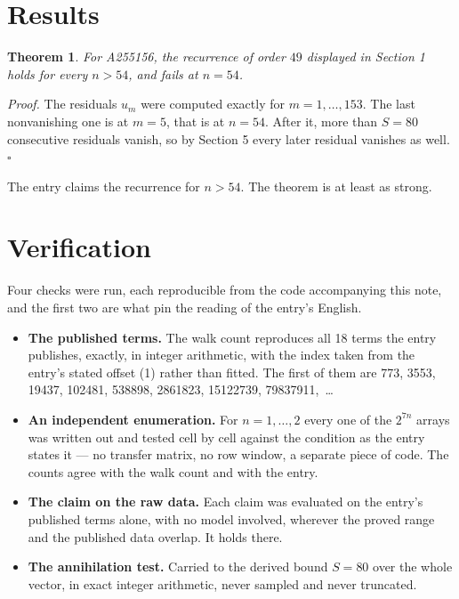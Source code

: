 \documentclass[11pt]{article}
\newtheorem{theorem}{Theorem}
\theoremstyle{definition}
\begin{document}
\section{Results}

\begin{theorem} For A255156, the recurrence of order $49$ displayed in Section 1 holds for every $n > 54$, and fails at $n = 54$.\end{theorem}

{\itshape Proof.} The residuals $u_m$ were computed exactly for $m = 1,\dots,153$. The last nonvanishing one is at $m = 5$, that is at $n = 54$. After it, more than $S = 80$ consecutive residuals vanish, so by Section 5 every later residual vanishes as well. $\square$

The entry claims the recurrence for $n > 54$. The theorem is at least as strong.

\section{Verification}

Four checks were run, each reproducible from the code accompanying this note, and the first two are what pin the reading of the entry's English.

\begin{itemize}

\item {\bfseries The published terms.} The walk count reproduces all 18 terms the entry publishes, exactly, in integer arithmetic, with the index taken from the entry's stated offset (1) rather than fitted. The first of them are 773, 3553, 19437, 102481, 538898, 2861823, 15122739, 79837911,~\dots

\item {\bfseries An independent enumeration.} For $n = 1,\dots,2$ every one of the $2^{7n}$ arrays was written out and tested cell by cell against the condition as the entry states it --- no transfer matrix, no row window, a separate piece of code. The counts agree with the walk count and with the entry.

\item {\bfseries The claim on the raw data.} Each claim was evaluated on the entry's published terms alone, with no model involved, wherever the proved range and the published data overlap. It holds there.

\item {\bfseries The annihilation test.} Carried to the derived bound $S = 80$ over the whole vector, in exact integer arithmetic, never sampled and never truncated.

\end{itemize}
\end{document}
